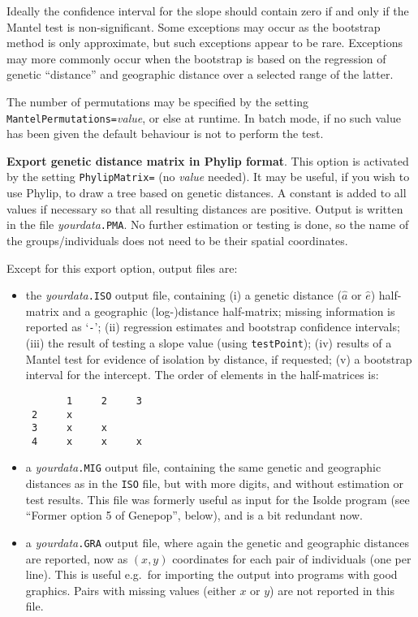 \documentclass[
  12pt,
]{book}
\begin{document}
Ideally the confidence interval for the slope should contain zero if and only if the Mantel test is non-significant. Some exceptions may occur as the bootstrap method is only approximate, but such exceptions appear to be rare. Exceptions may more commonly occur when the bootstrap is based on the regression of genetic ``distance'' and geographic distance over a selected range of the latter.

The number of permutations may be specified by the setting \texttt{MantelPermutations=}\emph{value}, or else at runtime. In batch mode, if no such value has been given the default behaviour is not to perform the test.

\textbf{Export genetic distance matrix in Phylip format}. This option is activated by the setting \texttt{PhylipMatrix=} (no \emph{value} needed). It may be useful, if you wish to use Phylip, to draw a tree based on genetic distances. A constant is added to all values if necessary so that all resulting distances are positive. Output is written in the file \emph{yourdata}\texttt{.PMA}. No further estimation or testing is done, so the name of the groups/individuals does not need to be their spatial coordinates.

Except for this export option, output files are:

\begin{itemize}
\item
  the \emph{yourdata}\texttt{.ISO} output file, containing (i) a genetic distance (\(\hat{a}\) or \(\hat{e}\)) half-matrix and a geographic (log-)distance half-matrix; missing information is reported as `\texttt{-}'; (ii) regression estimates and bootstrap confidence intervals; (iii) the result of testing a slope value (using \texttt{testPoint}); (iv) results of a Mantel test for evidence of isolation by distance, if requested; (v) a bootstrap interval for the intercept. The order of elements in the half-matrices is:

\begin{verbatim}
       1     2     3
 2     x
 3     x     x
 4     x     x     x
\end{verbatim}
\item
  a \emph{yourdata}\texttt{.MIG} output file, containing the same genetic and geographic distances as in the \texttt{ISO} file, but with more digits, and without estimation or test results. This file was formerly useful as input for the Isolde program (see ``Former option 5 of Genepop'', below), and is a bit redundant now.
\item
  a \emph{yourdata}\texttt{.GRA} output file, where again the genetic and geographic distances are reported, now as \((x,y)\) coordinates for each pair of individuals (one per line). This is useful e.g.~for importing the output into programs with good graphics. Pairs with missing values (either \(x\) or \(y\)) are not reported in this file.
\end{itemize}
\end{document}
